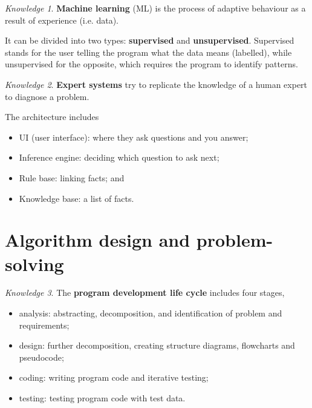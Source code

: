 \documentclass[8pt]{article}
\theoremstyle{remark}
\newtheorem{knowledge}{Knowledge}[subsection]
\begin{document}
            \begin{knowledge}
                \textbf{Machine learning} (ML) is the process of adaptive behaviour as a result of experience (i.e. data).

                It can be divided into two types: \textbf{supervised} and \textbf{unsupervised}. Supervised stands for the user telling the program what the data means (labelled), while unsupervised for the opposite, which requires the program to identify patterns.
            \end{knowledge}

            \begin{knowledge}
                \textbf{Expert systems} try to replicate the knowledge of a human expert to diagnose a problem.

                The architecture includes
                \begin{itemize}
                    \item UI (user interface): where they ask questions and you answer;
                    \item Inference engine: deciding which question to ask next;
                    \item Rule base: linking facts; and
                    \item Knowledge base: a list of facts.
                \end{itemize}
            \end{knowledge}

    \section{Algorithm design and problem-solving}
        \begin{knowledge}
            The \textbf{program development life cycle} includes four stages,
            \begin{itemize}
                \item analysis: abstracting, decomposition, and identification of problem and requirements;
                \item design: further decomposition, creating structure diagrams, flowcharts and pseudocode;
                \item coding: writing program code and iterative testing;
                \item testing: testing program code with test data.
            \end{itemize}
        \end{knowledge}
\end{document}

